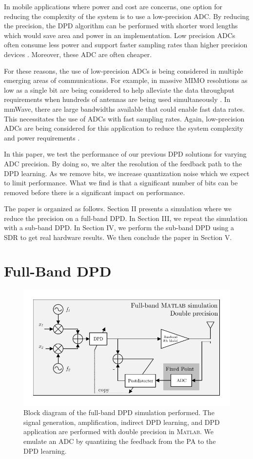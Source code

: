 \documentclass[conference]{IEEEtran}
\begin{document}
In mobile applications where power and cost are concerns, one option for reducing the complexity of the system is to use a low-precision ADC. 
By reducing the precision, the DPD algorithm can be performed with shorter word lengths which would save area and power in an implementation. 
Low precision ADCs often consume less power and support faster sampling rates than higher precision devices \cite{Walden99}. Moreover, these ADC are often cheaper. 

For these reasons, the use of low-precision ADCs is being considered in multiple emerging areas of communications. For example, in massive MIMO resolutions as low as a single bit are being considered to help alleviate the data throughput requirements when hundreds of antennas are being used simultaneously \cite{MIMOAdcs}. In mmWave, there are large bandwidths available that could enable fast data rates. This necessitates the use of ADCs with fast sampling rates. Again, low-precision ADCs are being considered for this application to reduce the system complexity and power requirements \cite{Heath2015}. 

In this paper, we test the performance of our previous DPD solutions for varying ADC precision. 
By doing so, we alter the resolution of the feedback path to the DPD learning. 
As we remove bits, we increase quantization noise which we expect to limit performance. 
What we find is that a significant number of bits can be removed before there is a significant impact on performance.

The paper is organized as follows. 
Section II presents a simulation where we reduce the precision on a full-band DPD. 
In Section III, we repeat the simulation with a sub-band DPD. 
In Section IV, we perform the sub-band DPD using a SDR to get real hardware results.
We then conclude the paper in Section V.

\section{Full-Band DPD}

\begin{figure}[]
	\centering
	\includegraphics[width=\columnwidth]{FullBandIndirect}
	\caption{Block diagram of the full-band DPD simulation performed. The signal generation, amplification, indirect DPD learning, and DPD application are performed with double precision in \textsc{Matlab}. We emulate an ADC by quantizing the feedback from the PA to the DPD learning.}
	\label{block}
\end{figure}
\end{document}
